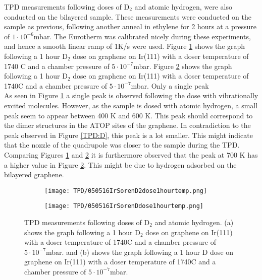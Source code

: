 TPD measurements following doses of D$_2$ and atomic hydrogen, were also conducted on the bilayered sample. These measurements were conducted on the sample as previous, following another anneal in ethylene for 2 hours at a pressure of $1\cdot10^{-6}$mbar. The Eurotherm was calibrated nicely during these experiments, and hence a smooth linear ramp of 1K/s were used. Figure \ref{TPD:D2bi} shows the graph following a 1 hour D$_2$ dose on graphene on Ir(111) with a doser temperature of 1740 \degree C and a chamber pressure of $5\cdot 10^{-7}$mbar. Figure \ref{TPD:Dbi} shows the graph following a 1 hour D$_2$ dose on graphene on Ir(111) with a doser temperature of 1740\degree C and a chamber pressure of $5\cdot 10^{-7}$mbar. Only a single peak\\
As seen in Figure \ref{TPD:D2bi} a single peak is observed following the dose with vibrationally excited molecules. However, as the sample is dosed with atomic hydrogen, a small peak seem to appear between 400 K and 600 K. This peak should correspond to the dimer structures in the ATOP sites of the graphene. In contradiction to the peak observed in Figure \ref{TPD:D}, this peak is a lot smaller. This might indicate that the nozzle of the quadrupole was closer to the sample during the TPD. Comparing Figures \ref{TPD:D2bi} and \ref{TPD:Dbi} it is furthermore observed that the peak at 700 K has a higher value in Figure \ref{TPD:Dbi}. This might be due to hydrogen adsorbed on the bilayered graphene.

\begin{figure}[H]
  \centering
  \begin{subfigure}[b]{0.45\textwidth}
    \texttt{[image: TPD/050516IrSorenD2dose1hourtemp.png]}
    \caption{}
    \label{TPD:D2bi}
  \end{subfigure}\hspace{0.5cm}
  \begin{subfigure}[b]{0.45\textwidth}
    \texttt{[image: TPD/050516IrSorenDdose1hourtemp.png]}
    \caption{}
    \label{TPD:Dbi}
  \end{subfigure}
  \caption{TPD measurements following doses of D$_2$ and atomic hydrogen. (a) shows the graph following a 1 hour D$_2$ dose on graphene on Ir(111) with a doser temperature of 1740\degree C and a chamber pressure of $5\cdot 10^{-7}$mbar. and (b) shows the graph following a 1 hour D dose on graphene on Ir(111) with a doser temperature of 1740\degree C and a chamber pressure of $5\cdot 10^{-7}$mbar.}
  \label{TPD:bi}
\end{figure}


